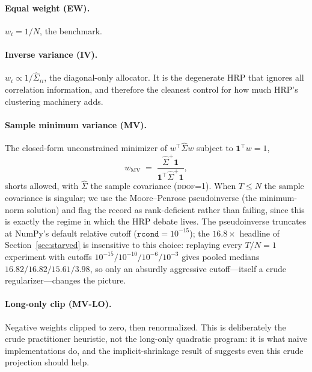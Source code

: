 \documentclass[11pt]{article}
\newcommand{\Sighat}{\widehat{\Sigma}}
\newcommand{\TN}{T/N}
\begin{document}
\paragraph{Equal weight (EW).} $w_i = 1/N$, the
\citet{demiguel2009optimal} benchmark.

\paragraph{Inverse variance (IV).} $w_i \propto 1/\Sighat_{ii}$, the
diagonal-only allocator. It is the degenerate HRP that ignores all
correlation information, and therefore the cleanest control for how much
HRP's clustering machinery adds.

\paragraph{Sample minimum variance (MV).} The closed-form unconstrained
minimizer of $w^{\top}\Sighat w$ subject to $\mathbf{1}^{\top}w=1$,
\begin{equation}
w_{\mathrm{MV}} \;=\; \frac{\Sighat^{+}\mathbf{1}}
{\mathbf{1}^{\top}\Sighat^{+}\mathbf{1}},
\label{eq:minvar}
\end{equation}
shorts allowed, with $\Sighat$ the sample covariance
(\textsc{ddof}=1). When $T\le N$ the sample covariance is singular; we use
the Moore--Penrose pseudoinverse (the minimum-norm solution) and flag the
record as rank-deficient rather than failing, since this is exactly the
regime in which the HRP debate lives. The pseudoinverse truncates at NumPy's
default relative cutoff ($\texttt{rcond}=10^{-15}$); the $16.8\times$
headline of Section~\ref{sec:starved} is insensitive to this choice:
replaying every $\TN=1$ experiment with cutoffs
$10^{-15}/10^{-10}/10^{-6}/10^{-3}$ gives pooled medians
$16.82/16.82/15.61/3.98$, so only an absurdly aggressive cutoff---itself a
crude regularizer---changes the picture.

\paragraph{Long-only clip (MV-LO).} Negative weights clipped to zero, then
renormalized. This is deliberately the crude practitioner heuristic, not the
long-only quadratic program: it is what naive implementations do, and the
implicit-shrinkage result of \citet{jagannathan2003risk} suggests even this
crude projection should help.
\end{document}
